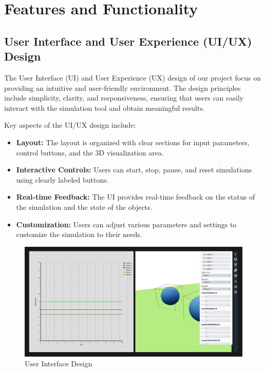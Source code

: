 \chapter{Features and Functionality}

\section{User Interface and User Experience (UI/UX) Design}

The User Interface (UI) and User Experience (UX) design of our project focus on providing an intuitive and user-friendly environment. The design principles include simplicity, clarity, and responsiveness, ensuring that users can easily interact with the simulation tool and obtain meaningful results.

Key aspects of the UI/UX design include:
\begin{itemize}
    \item \textbf{Layout:} The layout is organized with clear sections for input parameters, control buttons, and the 3D visualization area.
    \item \textbf{Interactive Controls:} Users can start, stop, pause, and reset simulations using clearly labeled buttons.
    \item \textbf{Real-time Feedback:} The UI provides real-time feedback on the status of the simulation and the state of the objects.
    \item \textbf{Customization:} Users can adjust various parameters and settings to customize the simulation to their needs.
\end{itemize}

\begin{figure}[h!]
    \centering
    \includegraphics[width=\textwidth]{ui_design.png}
    \caption{User Interface Design}
    \label{fig:ui_design}
\end{figure}

